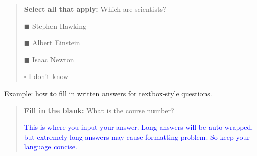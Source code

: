 \documentclass[12pt]{article}
\begin{document}
\begin{quote}
\textbf{Select all that apply:} Which are scientists?
    \begin{list}{}
    \item $\blacksquare$ Stephen Hawking 
    \item $\blacksquare$ Albert Einstein
    \item $\blacksquare$ Isaac Newton
    \item $\square$ I don't know
\end{list}
\end{quote}

Example: how to fill in written answers for textbox-style questions.

\begin{quote}
\textbf{Fill in the blank:} What is the course number?

\begin{tcolorbox}[fit,height=1cm, width=15cm, blank, borderline={1pt}{-2pt},nobeforeafter]
    \smallskip \textcolor{blue}{This is where you input your answer. Long answers will be auto-wrapped, but extremely long answers may cause formatting problem. So keep your language concise.}
    \end{tcolorbox}\hspace{2cm}
\end{quote}
\clearpage
\end{document}
